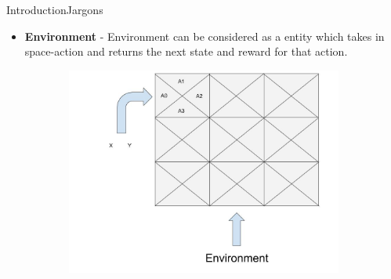 \documentclass[10pt]{beamer}
\begin{document}
\begin{frame}{Introduction}{Jargons}

 
\begin{itemize}
\item \textbf{Environment} - Environment can be considered as a entity which takes in space-action and returns the next state and reward for that action.
\end{itemize}

\begin{figure}[!htb]
\centering
\begin{subfigure}[t]{0.5\linewidth}
\includegraphics[width=1.4\textwidth]{assets/environment.jpg}
\end{subfigure}

\vspace{0.1in}
\label{fig:tripEmb}
\end{figure}

\end{frame}

\end{document}

